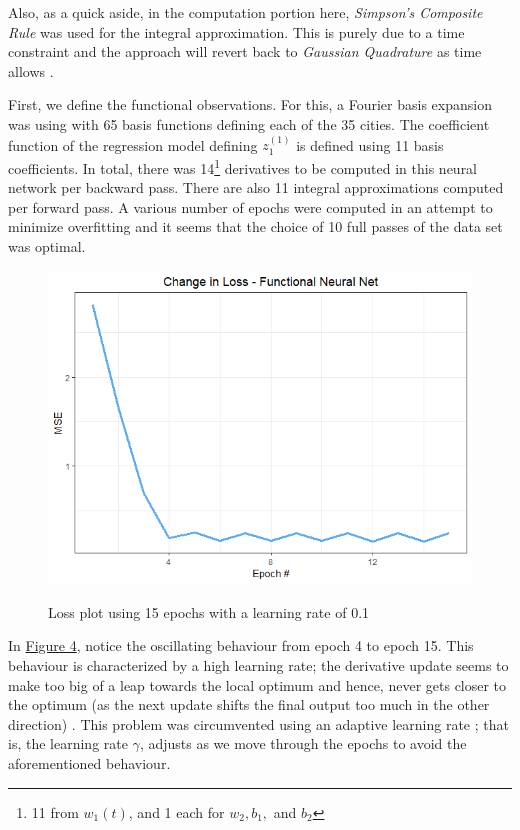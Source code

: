 \documentclass{article}
\begin{document}
\noindent Also, as a quick aside, in the computation portion here, \textit{Simpson's Composite Rule} was used for the integral approximation. This is purely due to a time constraint and the approach will revert back to \textit{Gaussian Quadrature} as time allows \cite{simpsons}.

\noindent First, we define the functional observations. For this, a Fourier basis expansion was using with 65 basis functions defining each of the 35 cities. The coefficient function of the regression model defining $z^{(1)}_{1}$ is defined using 11 basis coefficients. In total, there was 14\footnote{11 from $w_{1}(t)$, and 1 each for $w_{2}, b_{1},$ and $b_{2}$} derivatives to be computed in this neural network per backward pass. There are also 11 integral approximations computed per forward pass. A various number of epochs were computed in an attempt to minimize overfitting and it seems that the choice of 10 full passes of the data set was optimal.

\begin{figure}[h!]
  \centering
  \includegraphics[scale = 0.5]{funcNNLoss.png}
  \label{fig:funcNNLoss1}
  \caption{Loss plot using 15 epochs with a learning rate of 0.1}
\end{figure}

\noindent In \hyperref[fig:funcNNLoss1]{Figure 4}, notice the oscillating behaviour from epoch 4 to epoch 15. This behaviour is characterized by a high learning rate; the derivative update seems to make too big of a leap towards the local optimum and hence, never gets closer to the optimum (as the next update shifts the final output too much in the other direction) \cite{learnRate}. This problem was circumvented using an adaptive learning rate \cite{adam}; that is, the learning rate $\gamma$, adjusts as we move through the epochs to avoid the aforementioned behaviour.
\end{document}

